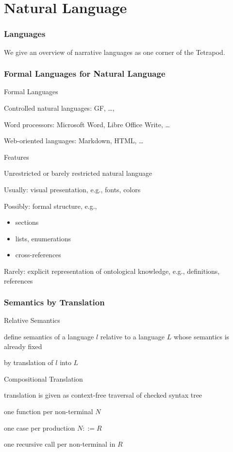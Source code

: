 \section{Natural Language}

\begin{frame}\frametitle{Languages}
We give an overview of narrative languages as one corner of the Tetrapod.
\end{frame}

\begin{frame}\frametitle{Formal Languages for Natural Language}
\begin{blockitems}{Formal Languages}
\item Controlled natural languages: GF, \ldots,
\item Word processors: Microsoft Word, Libre Office Write, \ldots
\item Web-oriented languages: Markdown, HTML, \ldots
\end{blockitems}

\begin{blockitems}{Features}
\item Unrestricted or barely restricted natural language
\item Usually: visual presentation, e.g., fonts, colors
\item Possibly: formal structure, e.g.,
 \begin{itemize}
 \item sections
 \item lists, enumerations
 \item cross-references
 \end{itemize}
\item Rarely: explicit representation of ontological knowledge, e.g., definitions, references 
\end{blockitems}
\end{frame}

\begin{frame}\frametitle{Semantics by Translation}
\begin{blockitems}{Relative Semantics}
\item define semantics of a language $l$ relative to a language $L$ whose semantics is already fixed
\item by translation of $l$ into $L$
\end{blockitems}

\begin{blockitems}{Compositional Translation}
\item translation is given as context-free traversal of checked syntax tree
\item one function per non-terminal $N$
\item one case per production $N ::= R$
\item one recursive call per non-terminal in $R$
\end{blockitems}
\end{frame}

